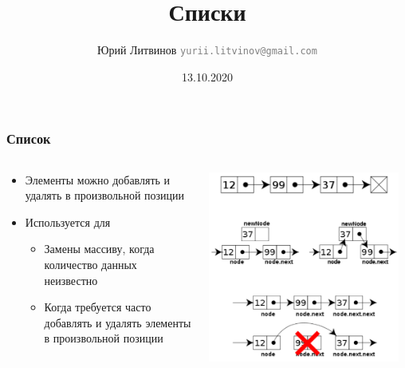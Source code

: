\documentclass[xetex,mathserif,serif]{beamer}
\title{Списки}
\author[Юрий Литвинов]{Юрий Литвинов \newline \textcolor{gray}{\small\texttt{yurii.litvinov@gmail.com}}}
\date{13.10.2020}
\begin{document}
	
	\frame{\titlepage}
	
	\begin{frame}
		\frametitle{Список}
		\begin{columns}
			\begin{column}{0.55\textwidth}
				\begin{itemize}
					\item Элементы можно добавлять и удалять в произвольной позиции
					\item Используется для
					\begin{itemize}
						\item Замены массиву, когда количество данных неизвестно
						\item Когда требуется часто добавлять и удалять элементы в произвольной позиции
					\end{itemize}
				\end{itemize}
			\end{column}
			\begin{column}{0.45\textwidth}
				\begin{center}
					\includegraphics[width=0.95\textwidth]{list.png}
				\end{center}
			\end{column}
		\end{columns}
	\end{frame}
\end{document}
